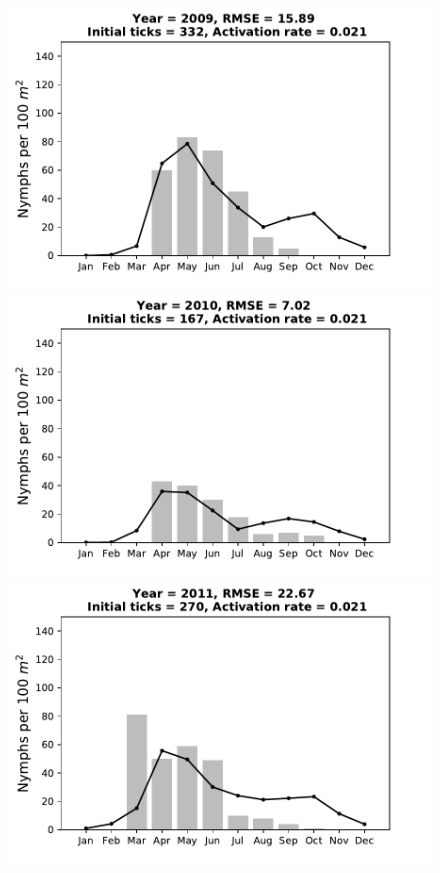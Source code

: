 \documentclass[a4paper, 11pt]{scrartcl}
\begin{document}
\begin{figure}[h!]
\centering
\begin{minipage}[c]{0.40\linewidth}
\includegraphics[width=\linewidth]{figures/s2/s2_2009}
\end{minipage}
\begin{minipage}[c]{0.40\linewidth}
\includegraphics[width=\linewidth]{figures/s2/s2_2010}
\end{minipage}
\begin{minipage}[c]{0.40\linewidth}
\includegraphics[width=\linewidth]{figures/s2/s2_2011}

\end{minipage}
\end{figure}
\end{document}
